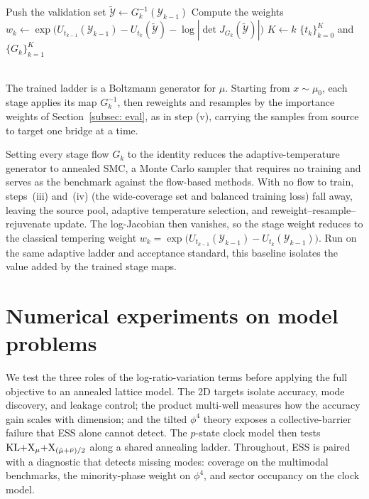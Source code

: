 \documentclass{article}
\begin{document}
\begin{algorithm}[p]
{{{        }
        Push the validation set $\tilde{\mathcal Y} \gets G_k^{-1}(\mathcal Y_{k-1})$\;
        Compute the weights $w_k \gets \exp\bigl(U_{t_{k-1}}(\mathcal Y_{k-1}) - U_{t_k}(\tilde{\mathcal Y}) - \log|\det J_{G_k}(\tilde{\mathcal Y})|\bigr)$\;
    }
}
$K \gets k$\;
\Return $\{t_k\}_{k=0}^{K}$ and $\{G_k\}_{k=1}^{K}$\;
\end{algorithm}
\mbox{}\\
The trained ladder is a Boltzmann generator for $\mu$. Starting from $x \sim \mu_0$, each stage applies its map $G_k^{-1}$, then reweights and resamples by the importance weights of Section~\ref{subsec: eval}, as in step (v), carrying the samples from source to target one bridge at a time.

Setting every stage flow $G_k$ to the identity reduces the adaptive-temperature generator to annealed SMC, a Monte Carlo sampler that requires no training and serves as the benchmark against the flow-based methods. With no flow to train, steps~(iii) and~(iv) (the wide-coverage set and balanced training loss) fall away, leaving the source pool, adaptive temperature selection, and reweight--resample--rejuvenate update. The log-Jacobian then vanishes, so the stage weight reduces to the classical tempering weight $w_k = \exp\bigl(U_{t_{k-1}}(\mathcal Y_{k-1}) - U_{t_k}(\mathcal Y_{k-1})\bigr)$. Run on the same adaptive ladder and acceptance standard, this baseline isolates the value added by the trained stage maps.


\section{Numerical experiments on model problems}
\label{sec: experiments}

We test the three roles of the log-ratio-variation terms before applying the full objective to an annealed lattice model. The 2D targets isolate accuracy, mode discovery, and leakage control; the product multi-well measures how the accuracy gain scales with dimension; and the tilted $\phi^4$ theory exposes a collective-barrier failure that ESS alone cannot detect. The $p$-state clock model then tests $\mathrm{KL}{+}\mathrm{X}_\mu{+}\mathrm{X}_{(\hat\mu+\bar\nu)/2}$ along a shared annealing ladder. Throughout, ESS is paired with a diagnostic that detects missing modes: coverage on the multimodal benchmarks, the minority-phase weight on $\phi^4$, and sector occupancy on the clock model.
\end{document}
